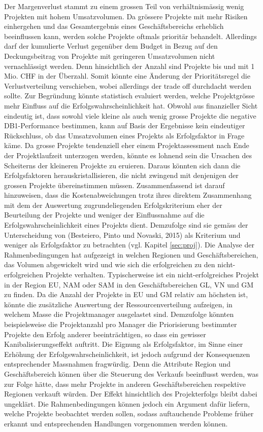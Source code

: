 \newline Der Margenverlust stammt zu einem grossen Teil von verhältnismässig wenig Projekten mit hohem Umsatzvolumen. Da grössere Projekte mit mehr Risiken einhergehen und das Gesamtergebnis eines Geschäftsbereichs erheblich beeinflussen kann, werden solche Projekte oftmals prioritär behandelt. Allerdings darf der kumulierte Verlust gegenüber dem Budget in Bezug auf den Deckungsbeitrag von Projekte mit geringeren Umsatzvolumen nicht vernachlässigt werden. Denn hinsichtlich der Anzahl sind Projekte bis und mit 1 Mio. CHF in der Überzahl. Somit könnte eine Änderung der Prioritätsregel die Verlustverteilung verschieben, wobei allerdings der trade off durchdacht werden sollte. Zur Begründung könnte statistisch evaluiert werden, welche Projektgrösse mehr Einfluss auf die Erfolgswahrscheinlichkeit hat. Obwohl aus finanzieller Sicht eindeutig ist, dass sowohl viele kleine als auch wenig grosse Projekte die negative DB1-Performance bestimmen, kann auf Basis der Ergebnisse kein eindeutiger Rückschluss, ob das Umsatzvolumen eines Projekts als Erfolgsfaktor in Frage käme. Da grosse Projekte tendenziell eher einem Projektassessment nach Ende der Projektlaufzeit unterzogen werden, könnte es lohnend sein die Ursachen des Scheiterns der kleineren Projekte zu eruieren. Daraus könnten sich dann die Erfolgsfaktoren herauskristallisieren, die nicht zwingend mit denjenigen der grossen Projekte übereinstimmen müssen. Zusammenfassend ist darauf hinzuweisen, dass die Kostenabweichungen trotz ihres direktem Zusammenhang mit dem der Auswertung zugrundeliegenden Erfolgskriterium eher der Beurteilung der Projekte und weniger der Einflussnahme auf die Erfolgswahrscheinlichkeit eines Projekts dient. Demzufolge sind sie gemäss der Unterscheidung von (Besteiero, Pinto und Novaski, 2015) als Kriterium und weniger als Erfolgsfaktor zu betrachten (vgl. Kapitel \ref{sec:proj}). 
\newline\newline
 Die Analyse der Rahmenbedingungen hat aufgezeigt in welchen Regionen und Geschäftsbereichen, das Volumen abgewickelt wird und wie sich die erfolgreichen zu den nicht-erfolgreichen Projekte verhalten. Typischerweise ist ein nicht-erfolgreiches Projekt in der Region EU, NAM oder SAM in den Geschäftsbereichen GL, VN und GM zu finden. Da die Anzahl der Projekte in EU und GM relativ am höchsten ist, könnte die zusätzliche Auswertung der Ressourcenverteilung aufzeigen, in welchem Masse die Projektmanager ausgelastet sind. Demzufolge könnten beispielsweise die Projektanzahl pro Manager die Priorisierung bestimmter Projekte den Erfolg anderer beeinträchtigen, so dass ein gewisser Kanibalisierungseffekt auftritt. Die Eignung als Erfolgsfaktor, im Sinne einer Erhöhung der Erfolgswahrscheinlichkeit, ist jedoch aufgrund der Konsequenzen entsprechender Massnahmen fragwürdig. Denn die Attribute Region und Geschäftsbereich können über die Steuerung des Verkaufs beeinflusst werden, was zur Folge hätte, dass mehr Projekte in anderen Geschäftsbereichen respektive Regionen verkauft würden. Der Effekt hinsichtlich des Projekterfolgs bleibt dabei ungeklärt. Die Rahmenbedingungen können jedoch ein Argument dafür liefern, welche Projekte beobachtet werden sollen, sodass auftauchende Probleme früher erkannt und entsprechenden Handlungen vorgenommen werden können.
